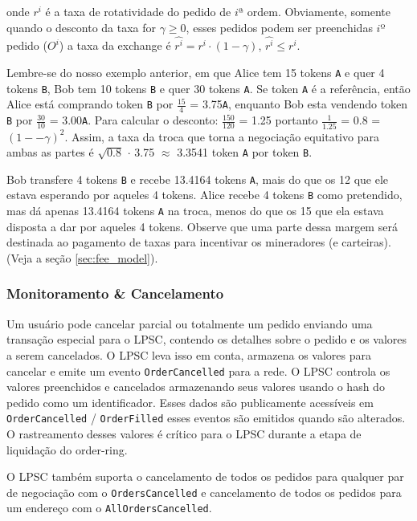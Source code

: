 \documentclass[UTF8,nofonts]{article}
\begin{document}
\begin{multicols}{2}
onde $r^i$ é a taxa de rotatividade do pedido de $i$ª ordem. Obviamente, somente quando o desconto da taxa for $\gamma \ge 0$, esses pedidos podem ser preenchidas $i$º pedido ($O^i$) a taxa da exchange é $\hat{r^i} = r^i \cdot (1-\gamma)$, $\hat{r^i}\le r^i$.

Lembre-se do nosso exemplo anterior, em que Alice tem 15 tokens \verb|A| e quer 4 tokens \verb|B|, Bob tem 10 tokens \verb|B| e quer 30 tokens \verb|A|. Se token \verb|A| é a referência, então Alice está comprando token \verb|B| por $\frac{15}{4}$ = 3.75\verb|A|, enquanto Bob esta vendendo token \verb|B| por $\frac{30}{10}$ = 3.00\verb|A|. Para calcular o desconto: $\frac{150}{120}$ = 1.25 portanto $\frac{1}{1.25}$ = 0.8 = $(1 −- \gamma)^2$. Assim, a taxa da troca que torna a negociação equitativo para ambas as partes é $\sqrt{0.8}$ $\cdot$ 3.75 $\approx$ 3.3541 token \verb|A| por token \verb|B|.

Bob transfere 4 tokens \verb|B| e recebe 13.4164 tokens \verb|A|, mais do que os 12 que ele estava esperando por aqueles 4 tokens. Alice recebe 4 tokens \verb|B| como pretendido, mas dá apenas 13.4164 tokens \verb|A| na troca, menos do que os 15 que ela estava disposta a dar por aqueles 4 tokens.
Observe que uma parte dessa margem será destinada ao pagamento de taxas para incentivar os mineradores (e carteiras). (Veja a seção \ref{sec:fee_model}).


\subsubsection{Monitoramento \& Cancelamento}

Um usuário pode cancelar parcial ou totalmente um pedido enviando uma transação especial para o LPSC, contendo os detalhes sobre o pedido e os valores a serem cancelados. O LPSC leva isso em conta, armazena os valores para cancelar e emite um evento \verb|OrderCancelled| para a rede. O LPSC controla os valores preenchidos e cancelados armazenando seus valores usando o hash do pedido como um identificador. Esses dados são publicamente acessíveis em \verb|OrderCancelled| / \verb|OrderFilled| esses eventos são emitidos quando são alterados. O rastreamento desses valores é crítico para o LPSC durante a etapa de liquidação do order-ring.

O LPSC também suporta o cancelamento de todos os pedidos para qualquer par de negociação com o \verb|OrdersCancelled| e cancelamento de todos os pedidos para um endereço com o \verb|AllOrdersCancelled|.



\end{multicols}
\end{document}
